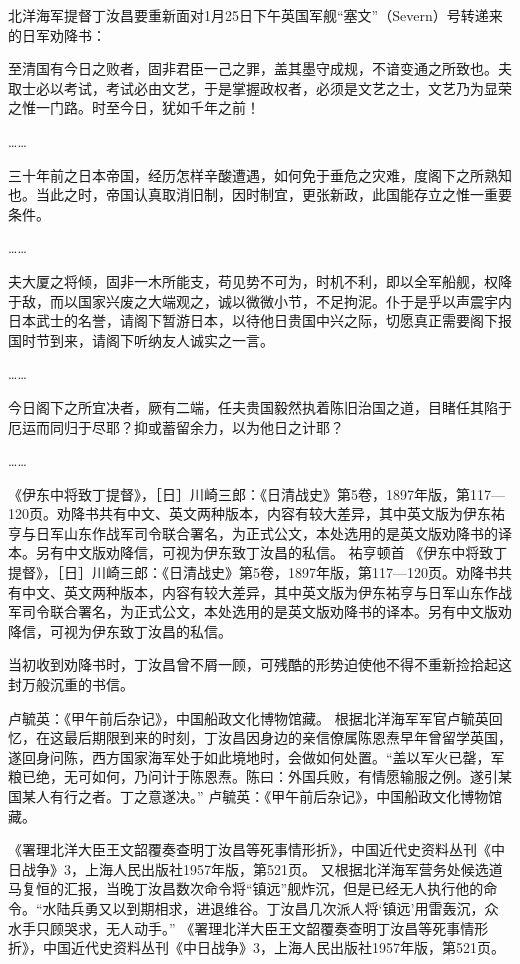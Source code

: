 \documentclass[12pt,UTF8]{ctexbook}
\begin{document}
北洋海军提督丁汝昌要重新面对1月25日下午英国军舰“塞文”（Severn）号转递来的日军劝降书：

至清国有今日之败者，固非君臣一己之罪，盖其墨守成规，不谙变通之所致也。夫取士必以考试，考试必由文艺，于是掌握政权者，必须是文艺之士，文艺乃为显荣之惟一门路。时至今日，犹如千年之前！

……

三十年前之日本帝国，经历怎样辛酸遭遇，如何免于垂危之灾难，度阁下之所熟知也。当此之时，帝国认真取消旧制，因时制宜，更张新政，此国能存立之惟一重要条件。

……

夫大厦之将倾，固非一木所能支，苟见势不可为，时机不利，即以全军船舰，权降于敌，而以国家兴废之大端观之，诚以微微小节，不足拘泥。仆于是乎以声震宇内日本武士的名誉，请阁下暂游日本，以待他日贵国中兴之际，切愿真正需要阁下报国时节到来，请阁下听纳友人诚实之一言。

……

今日阁下之所宜决者，厥有二端，任夫贵国毅然执着陈旧治国之道，目睹任其陷于厄运而同归于尽耶？抑或蓄留余力，以为他日之计耶？

……

《伊东中将致丁提督》，［日］川崎三郎：《日清战史》第5卷，1897年版，第117—120页。劝降书共有中文、英文两种版本，内容有较大差异，其中英文版为伊东祐亨与日军山东作战军司令联合署名，为正式公文，本处选用的是英文版劝降书的译本。另有中文版劝降信，可视为伊东致丁汝昌的私信。
祐亨顿首 《伊东中将致丁提督》，［日］川崎三郎：《日清战史》第5卷，1897年版，第117—120页。劝降书共有中文、英文两种版本，内容有较大差异，其中英文版为伊东祐亨与日军山东作战军司令联合署名，为正式公文，本处选用的是英文版劝降书的译本。另有中文版劝降信，可视为伊东致丁汝昌的私信。

当初收到劝降书时，丁汝昌曾不屑一顾，可残酷的形势迫使他不得不重新捡拾起这封万般沉重的书信。

卢毓英：《甲午前后杂记》，中国船政文化博物馆藏。
根据北洋海军军官卢毓英回忆，在这最后期限到来的时刻，丁汝昌因身边的亲信僚属陈恩焘早年曾留学英国，遂回身问陈，西方国家海军处于如此境地时，会做如何处置。“盖以军火已罄，军粮已绝，无可如何，乃问计于陈恩焘。陈曰：外国兵败，有情愿输服之例。遂引某国某人有行之者。丁之意遂决。” 卢毓英：《甲午前后杂记》，中国船政文化博物馆藏。

《署理北洋大臣王文韶覆奏查明丁汝昌等死事情形折》，中国近代史资料丛刊《中日战争》3，上海人民出版社1957年版，第521页。
又根据北洋海军营务处候选道马复恒的汇报，当晚丁汝昌数次命令将“镇远”舰炸沉，但是已经无人执行他的命令。“水陆兵勇又以到期相求，进退维谷。丁汝昌几次派人将‘镇远’用雷轰沉，众水手只顾哭求，无人动手。” 《署理北洋大臣王文韶覆奏查明丁汝昌等死事情形折》，中国近代史资料丛刊《中日战争》3，上海人民出版社1957年版，第521页。
\end{document}
